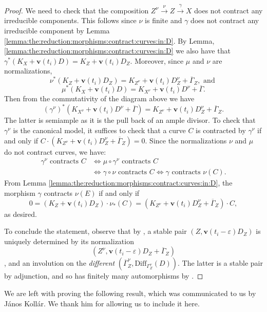 \documentclass[11pt]{amsart}
\theoremstyle{definition}
\theoremstyle{remark}
\newcommand{\Diff}{\mathrm{Diff}}
\newcommand{\bfv}{\mathbf{v}}
\begin{document}
\begin{proof}
		We need to check that the composition $Z^\nu \xrightarrow{\nu} Z \xrightarrow{\gamma} X $ does not contract any irreducible components.
		This follows since $\nu$ is finite and $\gamma$ does not contract any irreducible component by Lemma \ref{lemma:the:reduction:morphisms:contract:curves:in:D}. By Lemma, \ref{lemma:the:reduction:morphisms:contract:curves:in:D} we also have that $\gamma^*(K_X+\bfv(t_i)D) = K_Z+\bfv(t_i )D_Z$. Moreover,
		since $\mu$ and $\nu$ are normalizations, $$\nu^*(K_Z+\bfv(t_i)D_Z) = K_{Z^\nu}+\bfv(t_i)D_Z^\nu + \overline{\Gamma}_Z, \text{ and }
		$$
		$$
		\mu^*(K_X + \bfv(t_i)D) = K_{X^\nu} + \bfv(t_i)D^\nu + \overline{\Gamma}.
		$$
		Then from the commutativity of the diagram above we have $$(\gamma^\nu)^*(K_{X^\nu} + \bfv(t_i)D^\nu + \overline{\Gamma}) = K_{Z^\nu} + \mathbf{v}(t_i)D^\nu_Z+\overline{\Gamma}_Z.$$
		The latter is semiample as it is the pull back of an ample divisor. To check that $\gamma^\nu$ is the canonical model, it suffices to check that a curve $C$ is contracted by $\gamma^\nu$ if and only if $C\cdot(K_{Z^\nu} + \mathbf{v}(t_i)D^\nu_Z+\overline{\Gamma}_Z)=0$.
		Since the normalizations $\nu$ and $\mu$ do not contract curves, we have:
		\begin{align*}
			\gamma^\nu \text{ contracts }C &\Longleftrightarrow \mu \circ \gamma^\nu \text{ contracts }C \\ &\Longleftrightarrow \gamma \circ \nu \text{ contracts }C \Longleftrightarrow \gamma \text{ contracts } \nu(C).
		\end{align*}
		From Lemma \ref{lemma:the:reduction:morphisms:contract:curves:in:D}, the morphism $\gamma$ contracts $\nu(E)$ if and only if 
		$$
		0=(K_Z+\mathbf{v}(t_i)D_Z)\cdot\nu_*(C)=(K_{Z^\nu} + \mathbf{v}(t_i)D^\nu_Z+\overline{\Gamma}_Z)\cdot C,
		$$ 
		as desired.
		
		To conclude the statement, observe that by \cite[Theorem 5.13]{Kollarsingmmp}, a stable pair $(Z,\bfv(t_i-\varepsilon)D_Z)$ is uniquely determined by its normalization $$(Z^\nu,\bfv(t_i-\varepsilon)D_Z + \overline{\Gamma}_Z)$$, and an involution on the \textit{different} $(\overline{\Gamma}^\nu_Z, \Diff_{\Gamma^\nu_Z}(D))$. The latter is a stable pair by adjunction, and so has finitely many automorphisms by \cite[Proposition 5.5]{KP17}.
	\end{proof}
	We are left with proving the following result, which was communicated to us by J\'anos Koll\'ar. We thank him for allowing us to include it here.
	
\end{document}
